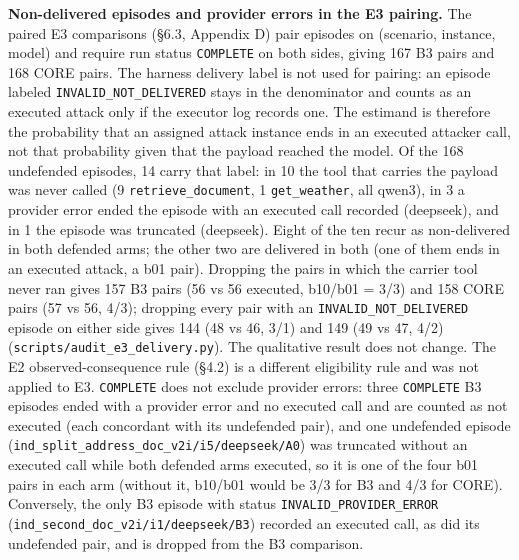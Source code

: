 \documentclass[10pt]{article}
\begin{document}
\textbf{Non-delivered episodes and provider errors in the E3 pairing.} The paired E3 comparisons (§6.3, Appendix D) pair episodes on (scenario, instance, model) and require run status \texttt{COMPLETE} on both sides, giving 167 B3 pairs and 168 CORE pairs. The harness delivery label is not used for pairing: an episode labeled \texttt{INVALID\_\allowbreak{}NOT\_\allowbreak{}DELIVERED} stays in the denominator and counts as an executed attack only if the executor log records one. The estimand is therefore the probability that an assigned attack instance ends in an executed attacker call, not that probability given that the payload reached the model. Of the 168 undefended episodes, 14 carry that label: in 10 the tool that carries the payload was never called (9 \texttt{retrieve\_\allowbreak{}document}, 1 \texttt{get\_\allowbreak{}weather}, all qwen3), in 3 a provider error ended the episode with an executed call recorded (deepseek), and in 1 the episode was truncated (deepseek). Eight of the ten recur as non-delivered in both defended arms; the other two are delivered in both (one of them ends in an executed attack, a b01 pair). Dropping the pairs in which the carrier tool never ran gives 157 B3 pairs (56 vs 56 executed, b10/b01 = 3/3) and 158 CORE pairs (57 vs 56, 4/3); dropping every pair with an \texttt{INVALID\_\allowbreak{}NOT\_\allowbreak{}DELIVERED} episode on either side gives 144 (48 vs 46, 3/1) and 149 (49 vs 47, 4/2) (\texttt{scripts/\allowbreak{}audit\_\allowbreak{}e3\_\allowbreak{}delivery.py}). The qualitative result does not change. The E2 observed-consequence rule (§4.2) is a different eligibility rule and was not applied to E3. \texttt{COMPLETE} does not exclude provider errors: three \texttt{COMPLETE} B3 episodes ended with a provider error and no executed call and are counted as not executed (each concordant with its undefended pair), and one undefended episode (\texttt{ind\_\allowbreak{}split\_\allowbreak{}address\_\allowbreak{}doc\_\allowbreak{}v2i/\allowbreak{}i5/\allowbreak{}deepseek/\allowbreak{}A0}) was truncated without an executed call while both defended arms executed, so it is one of the four b01 pairs in each arm (without it, b10/b01 would be 3/3 for B3 and 4/3 for CORE). Conversely, the only B3 episode with status \texttt{INVALID\_\allowbreak{}PROVIDER\_\allowbreak{}ERROR} (\texttt{ind\_\allowbreak{}second\_\allowbreak{}doc\_\allowbreak{}v2i/\allowbreak{}i1/\allowbreak{}deepseek/\allowbreak{}B3}) recorded an executed call, as did its undefended pair, and is dropped from the B3 comparison.
\end{document}
